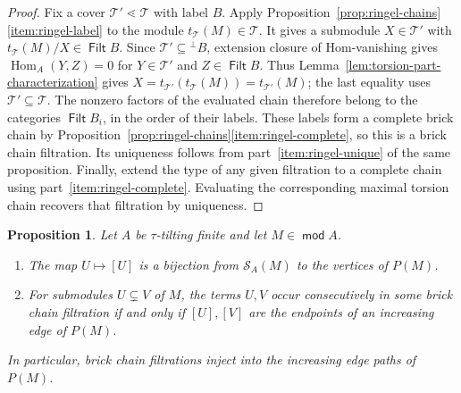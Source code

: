 \documentclass[a4paper,reqno,10pt]{amsart}
\newtheorem{proposition}[theorem]{Proposition}
\theoremstyle{definition}
\numberwithin{equation}{section}
\newcommand{\Hom}{\operatorname{Hom}}
\DeclareMathOperator{\modu}{\mathsf{mod}}
\newcommand{\T}{\mathcal T}
\DeclareMathOperator{\Filt}{\mathsf{Filt}}
\newcommand{\Sol}{\mathcal S}
\begin{document}
\begin{proof}
Fix a cover $\T'\lessdot\T$ with label $B$. Apply
Proposition~\ref{prop:ringel-chains}\ref{item:ringel-label} to the
module $t_\T(M)\in\T$. It gives a submodule $X\in\T'$ with
$t_\T(M)/X\in\Filt B$. Since $\T'\subseteq{}^\perp B$, extension
closure of Hom-vanishing gives $\Hom_A(Y,Z)=0$ for
$Y\in\T'$ and $Z\in\Filt B$. Thus
Lemma~\ref{lem:torsion-part-characterization} gives
$X=t_{\T'}(t_\T(M))=t_{\T'}(M)$; the last equality uses
$\T'\subseteq\T$.
The nonzero factors of the evaluated chain therefore belong to the
categories $\Filt B_i$, in the order of their labels. These labels form
a complete brick chain by
Proposition~\ref{prop:ringel-chains}\ref{item:ringel-complete}, so
this is a brick chain filtration. Its uniqueness follows from
part~\ref{item:ringel-unique} of the same proposition.
Finally, extend the type of any given filtration to a complete chain
using part~\ref{item:ringel-complete}. Evaluating the corresponding
maximal torsion chain recovers that filtration by uniqueness.
\end{proof}

\begin{proposition}\label{prop:filtration-edges}
Let $A$ be $\tau$-tilting finite and let $M\in\modu A$.
\begin{enumerate}
\item\label{item:solid-vertices}
The map $U\mapsto[U]$ is a bijection from $\Sol_A(M)$ to the
vertices of $P(M)$.
\item\label{item:filtration-edges}
For submodules $U\subsetneq V$ of $M$, the terms $U,V$ occur
consecutively in some brick chain filtration if and only if $[U],[V]$
are the endpoints of an increasing edge of $P(M)$.
\end{enumerate}
In particular, brick chain filtrations inject into the increasing
edge paths of $P(M)$.
\end{proposition}
\end{document}
